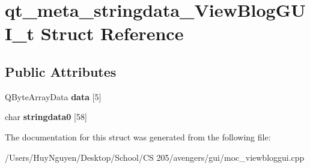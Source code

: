 \hypertarget{structqt__meta__stringdata__ViewBlogGUI__t}{}\section{qt\+\_\+meta\+\_\+stringdata\+\_\+\+View\+Blog\+G\+U\+I\+\_\+t Struct Reference}
\label{structqt__meta__stringdata__ViewBlogGUI__t}
\subsection*{Public Attributes}
\begin{DoxyCompactItemize}
\item 
Q\+Byte\+Array\+Data {\bfseries data} \mbox{[}5\mbox{]}\hypertarget{structqt__meta__stringdata__ViewBlogGUI__t_a21a757ee1ce9447d1fb015fec4f2855b}{}\label{structqt__meta__stringdata__ViewBlogGUI__t_a21a757ee1ce9447d1fb015fec4f2855b}

\item 
char {\bfseries stringdata0} \mbox{[}58\mbox{]}\hypertarget{structqt__meta__stringdata__ViewBlogGUI__t_a5e2de09f171cd2a54ab3fcfdeffc76b1}{}\label{structqt__meta__stringdata__ViewBlogGUI__t_a5e2de09f171cd2a54ab3fcfdeffc76b1}

\end{DoxyCompactItemize}


The documentation for this struct was generated from the following file\+:\begin{DoxyCompactItemize}
\item 
/\+Users/\+Huy\+Nguyen/\+Desktop/\+School/\+C\+S 205/avengers/gui/moc\+\_\+viewbloggui.\+cpp\end{DoxyCompactItemize}
